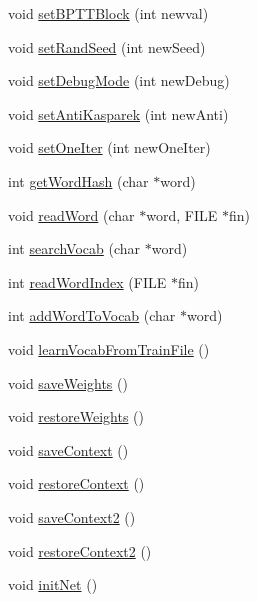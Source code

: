 \begin{DoxyCompactItemize}
\item 
void \hyperlink{class_c_rnn_l_m_ad021832dfab794c85012d0c5851e3c49}{set\+B\+P\+T\+T\+Block} (int newval)
\item 
void \hyperlink{class_c_rnn_l_m_af97a542ceffb1764eb6742b588048c6a}{set\+Rand\+Seed} (int new\+Seed)
\item 
void \hyperlink{class_c_rnn_l_m_ae261f3b7bc389f285f56877a6ed01188}{set\+Debug\+Mode} (int new\+Debug)
\item 
void \hyperlink{class_c_rnn_l_m_a029bf01605c10b3164215d75f0f6660f}{set\+Anti\+Kasparek} (int new\+Anti)
\item 
void \hyperlink{class_c_rnn_l_m_ab171620cc804319366e85d5f4141a33f}{set\+One\+Iter} (int new\+One\+Iter)
\item 
int \hyperlink{class_c_rnn_l_m_ae6da6a326e43726520638249042708c6}{get\+Word\+Hash} (char $\ast$word)
\item 
void \hyperlink{class_c_rnn_l_m_aad8a8cc16db1c424b35a4332b8876b53}{read\+Word} (char $\ast$word, F\+I\+LE $\ast$fin)
\item 
int \hyperlink{class_c_rnn_l_m_a4e020c1ac890b617c5c209b88ca35097}{search\+Vocab} (char $\ast$word)
\item 
int \hyperlink{class_c_rnn_l_m_ac0a30a1a7f8afa4f66ff2255863d0e87}{read\+Word\+Index} (F\+I\+LE $\ast$fin)
\item 
int \hyperlink{class_c_rnn_l_m_a8ae84e317f16a2509deabf6287666f56}{add\+Word\+To\+Vocab} (char $\ast$word)
\item 
void \hyperlink{class_c_rnn_l_m_a26ee6d7beba08f0ea3dd3f27c0025c44}{learn\+Vocab\+From\+Train\+File} ()
\item 
void \hyperlink{class_c_rnn_l_m_aeccb688089da8a71d82c412f3f454840}{save\+Weights} ()
\item 
void \hyperlink{class_c_rnn_l_m_a6a2a247ad2651487ed0e811ad1211516}{restore\+Weights} ()
\item 
void \hyperlink{class_c_rnn_l_m_a86ad944c56163f32905610caa16dedb4}{save\+Context} ()
\item 
void \hyperlink{class_c_rnn_l_m_aaeedc59a9cda172e559256951aae2ae8}{restore\+Context} ()
\item 
void \hyperlink{class_c_rnn_l_m_aefcd658463f107d096062cba1c70f6e8}{save\+Context2} ()
\item 
void \hyperlink{class_c_rnn_l_m_a8a24bfc22d014a36a2e6f2dfdcf9b141}{restore\+Context2} ()
\item 
void \hyperlink{class_c_rnn_l_m_a0eff58ac237b3d83e0fee02cb769e440}{init\+Net} ()
\item 

\end{DoxyCompactItemize}
